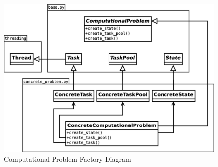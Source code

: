 \documentclass{article}
\begin{document}
\begin{figure}[H]
	\centering
	\includegraphics[width=\linewidth]{diagrams/FactoryDiagram.eps}
	\caption{Computational Problem Factory Diagram}
\end{figure}
\end{document}
